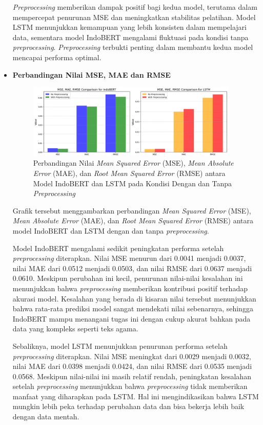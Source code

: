 \documentclass[12pt,a4paper]{article}
\begin{document}
\begin{itemize}
    \textit{Preprocessing} memberikan dampak positif bagi kedua model, terutama dalam mempercepat penurunan MSE dan meningkatkan stabilitas pelatihan. Model LSTM menunjukkan kemampuan yang lebih konsisten dalam mempelajari data, sementara model IndoBERT mengalami fluktuasi pada kondisi tanpa \textit{preprocessing}. \textit{Preprocessing} terbukti penting dalam membantu kedua model mencapai performa optimal.

    \item \textbf{Perbandingan Nilai MSE, MAE dan RMSE}
    \begin{figure}[H]
        \centering
        \includegraphics[width=0.95\textwidth]{images/mse, mae, rmse comparison.png}
        \caption{Perbandingan Nilai \textit{Mean Squared Error} (MSE), \textit{Mean Absolute Error} (MAE), dan \textit{Root Mean Squared Error} (RMSE) antara Model IndoBERT dan LSTM pada Kondisi Dengan dan Tanpa \textit{Preprocessing}}
        \label{fig:Perbandingan Nilai MSE, MAE dan RMSE}
    \end{figure}
    Grafik tersebut menggambarkan perbandingan \textit{Mean Squared Error} (MSE), \textit{Mean Absolute Error} (MAE), dan \textit{Root Mean Squared Error} (RMSE) antara model IndoBERT dan LSTM dengan dan tanpa \textit{preprocessing}.

    Model IndoBERT mengalami sedikit peningkatan performa setelah \textit{preprocessing} diterapkan. Nilai MSE menurun dari 0.0041 menjadi 0.0037, nilai MAE dari 0.0512 menjadi 0.0503, dan nilai RMSE dari 0.0637 menjadi 0.0610. Meskipun perubahan ini kecil, penurunan nilai-nilai kesalahan ini menunjukkan bahwa \textit{preprocessing} memberikan kontribusi positif terhadap akurasi model. Kesalahan yang berada di kisaran nilai tersebut menunjukkan bahwa rata-rata prediksi model sangat mendekati nilai sebenarnya, sehingga IndoBERT mampu menangani tugas ini dengan cukup akurat bahkan pada data yang kompleks seperti teks agama.

    Sebaliknya, model LSTM menunjukkan penurunan performa setelah \textit{preprocessing} diterapkan. Nilai MSE meningkat dari 0.0029 menjadi 0.0032, nilai MAE dari 0.0398 menjadi 0.0424, dan nilai RMSE dari 0.0535 menjadi 0.0568. Meskipun nilai-nilai ini masih relatif rendah, peningkatan kesalahan setelah \textit{preprocessing} menunjukkan bahwa \textit{preprocessing} tidak memberikan manfaat yang diharapkan pada LSTM. Hal ini mengindikasikan bahwa LSTM mungkin lebih peka terhadap perubahan data dan bisa bekerja lebih baik dengan data mentah.
    

\end{itemize}
\end{document}
